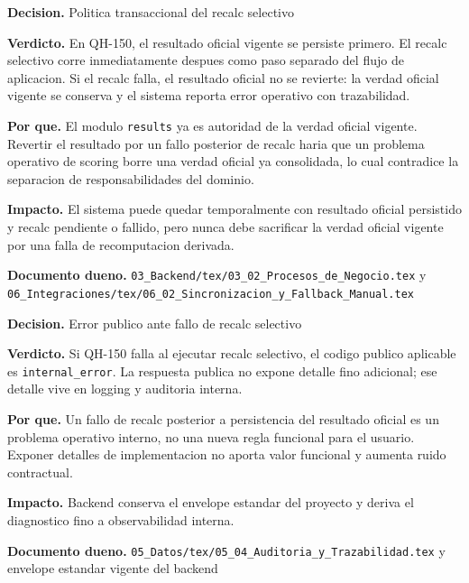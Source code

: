 \begin{docnote}
\textbf{Decision.} Politica transaccional del recalc selectivo

\textbf{Verdicto.} En QH-150, el resultado oficial vigente se persiste primero. El recalc selectivo corre inmediatamente despues como paso separado del flujo de aplicacion. Si el recalc falla, el resultado oficial no se revierte: la verdad oficial vigente se conserva y el sistema reporta error operativo con trazabilidad.

\textbf{Por que.} El modulo \texttt{results} ya es autoridad de la verdad oficial vigente. Revertir el resultado por un fallo posterior de recalc haria que un problema operativo de scoring borre una verdad oficial ya consolidada, lo cual contradice la separacion de responsabilidades del dominio.

\textbf{Impacto.} El sistema puede quedar temporalmente con resultado oficial persistido y recalc pendiente o fallido, pero nunca debe sacrificar la verdad oficial vigente por una falla de recomputacion derivada.

\textbf{Documento dueno.} \texttt{03\_Backend/tex/03\_02\_Procesos\_de\_Negocio.tex} y \texttt{06\_Integraciones/tex/06\_02\_Sincronizacion\_y\_Fallback\_Manual.tex}
\end{docnote}

\begin{docnote}
\textbf{Decision.} Error publico ante fallo de recalc selectivo

\textbf{Verdicto.} Si QH-150 falla al ejecutar recalc selectivo, el codigo publico aplicable es \texttt{internal\_error}. La respuesta publica no expone detalle fino adicional; ese detalle vive en logging y auditoria interna.

\textbf{Por que.} Un fallo de recalc posterior a persistencia del resultado oficial es un problema operativo interno, no una nueva regla funcional para el usuario. Exponer detalles de implementacion no aporta valor funcional y aumenta ruido contractual.

\textbf{Impacto.} Backend conserva el envelope estandar del proyecto y deriva el diagnostico fino a observabilidad interna.

\textbf{Documento dueno.} \texttt{05\_Datos/tex/05\_04\_Auditoria\_y\_Trazabilidad.tex} y envelope estandar vigente del backend
\end{docnote}


